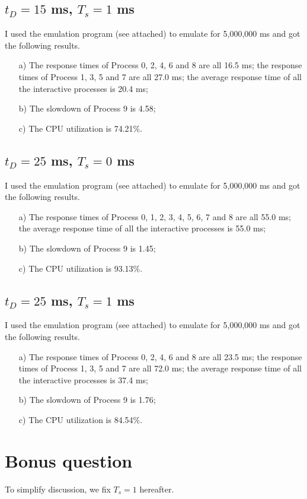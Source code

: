 \documentclass[12pt,letterpaper]{article}
\begin{document}
\subsection{$t_D=15$ ms, $T_s = 1$ ms}
I used the emulation program (see attached) to emulate for 5,000,000 ms and got the following results.
\begin{enumerate}
\item[a)] The response times of Process 0, 2, 4, 6 and 8 are all 16.5 ms; the response times of Process 1, 3, 5 and 7 are all 27.0 ms; the average response time of all the interactive processes is 20.4 ms;
\item[b)] The slowdown of Process 9 is 4.58;
\item[c)] The CPU utilization is 74.21\%.
\end{enumerate}

\subsection{$t_D=25$ ms, $T_s = 0$ ms}
I used the emulation program (see attached) to emulate for 5,000,000 ms and got the following results.
\begin{enumerate}
\item[a)] The response times of Process 0, 1, 2, 3, 4, 5, 6, 7 and 8 are all 55.0 ms; the average response time of all the interactive processes is 55.0 ms;
\item[b)] The slowdown of Process 9 is 1.45;
\item[c)] The CPU utilization is 93.13\%.
\end{enumerate}

\subsection{$t_D=25$ ms, $T_s = 1$ ms}
I used the emulation program (see attached) to emulate for 5,000,000 ms and got the following results.
\begin{enumerate}
\item[a)] The response times of Process 0, 2, 4, 6 and 8 are all 23.5 ms; the response times of Process 1, 3, 5 and 7 are all 72.0 ms; the average response time of all the interactive processes is 37.4 ms;
\item[b)] The slowdown of Process 9 is 1.76;
\item[c)] The CPU utilization is 84.54\%.
\end{enumerate}

\section{Bonus question}
To simplify discussion, we fix $T_s = 1$ hereafter.
\end{document}
